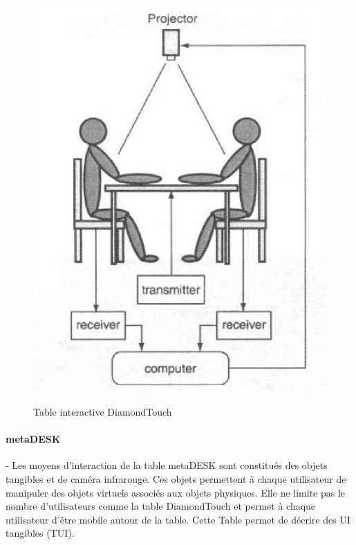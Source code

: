 \begin{figure}[h]
\begin{center}
\includegraphics[scale=.4]{chap2/img-10}
\caption{Table interactive DiamondTouch}\label{fig:chap2:10}
\label{fig:chap2:17}
\end{center}
\end{figure}

\paragraph {metaDESK}-
\label{sec:chap2:3:1:2}
Les moyens d'interaction de la table metaDESK sont constitués des objets tangibles et de caméra infrarouge. Ces objets permettent à chaque utilisateur de manipuler des objets virtuels associés aux objets physiques. Elle ne limite pas le nombre d'utilisateurs comme la table DiamondTouch et permet à chaque utilisateur d'être mobile autour de la table. Cette Table permet de décrire des UI tangibles (TUI).

